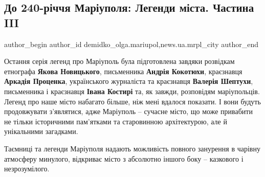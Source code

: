  
 
 
 
 
 
\subsection{До 240-річчя Маріуполя: Легенди міста. Частина III}
\label{sec:24_09_2018.stz.news.ua.mrpl_city.1.240_rokiv_legendy_mista_3}
 
\ifcmt
 author_begin
   author_id demidko_olga.mariupol,news.ua.mrpl_city
 author_end
\fi


\vspace{0.5cm}
\vspace{0.5cm}

Остання серія легенд про Маріуполь була підготовлена завдяки розвідкам
етнографа \textbf{Якова Новицького}, письменника \textbf{Андрія Кокотюхи}, краєзнавця \textbf{Аркадія
Проценка}, українського журналіста та краєзнавця \textbf{Валерія Шептухи}, письменника і
краєзнавця \textbf{Івана Костирі} та, як завжди, розповідям маріупольців. Легенд про
наше місто набагато більше, ніж мені вдалося показати. І вони будуть
продовжувати з'являтися, адже Маріуполь – сучасне місто, що може привабити не
тільки історичними пам'ятками та старовинною архітектурою, але й унікальними
загадками.

Таємниці та легенди Маріуполя надають можливість повного занурення в чарівну
атмосферу минулого, відкриває місто з абсолютно іншого боку – казкового і
незрозумілого.

